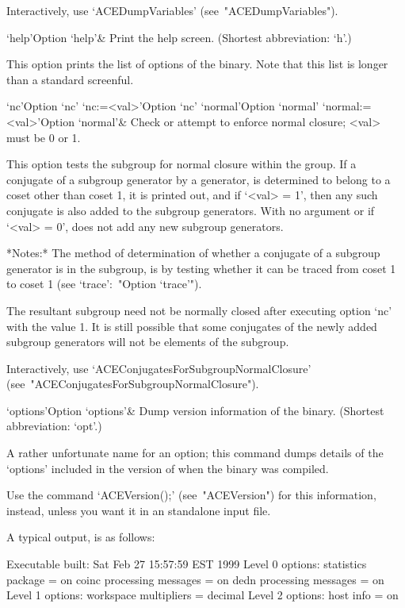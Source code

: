 Interactively, use `ACEDumpVariables' (see~"ACEDumpVariables").

\>`help'{Option `help'}&
Print the {\ACE} help screen. (Shortest abbreviation: `h'.)

This option prints the list of options of the {\ACE} binary. Note that
this list is longer than a standard screenful.

\>`nc'{Option `nc'}
\>`nc:=<val>'{Option `nc'}
\>`normal'{Option `normal'}
\>`normal:=<val>'{Option `normal'}&
Check or attempt to enforce normal closure; <val> must be 0 or 1.

This option tests the subgroup for normal closure within the group. If
a conjugate of a subgroup generator by a generator, is  determined  to
belong to a coset other than coset 1, it is printed out, and if `<val>
=  1',  then  any  such  conjugate  is  also  added  to  the  subgroup
generators. With no argument or if `<val> = 0', {\ACE}  does  not  add
any new subgroup generators.

*Notes:*
The method of determination of  whether  a  conjugate  of  a  subgroup
generator is in the subgroup, is by testing whether it can  be  traced
from coset 1 to coset 1  (see  `trace':~"Option `trace'").

The resultant subgroup need not be  normally  closed  after  executing
option `nc'  with  the  value  1.  It  is  still  possible  that  some
conjugates of the newly added subgroup generators will not be elements
of the subgroup.

Interactively,       use       `ACEConjugatesForSubgroupNormalClosure'
(see~"ACEConjugatesForSubgroupNormalClosure").

\>`options'{Option `options'}&
Dump version information of the {\ACE} binary.
(Shortest abbreviation: `opt'.)

A rather unfortunate name for an option; this command dumps details of
the \lq{}options' included in the version of {\ACE}  when  the  {\ACE}
binary was compiled.

Use  the   command   `ACEVersion();'   (see~"ACEVersion")   for   this
information, instead, unless you want it in an {\ACE} standalone input
file.

A typical output, is as follows:

\begintt
Executable built:
  Sat Feb 27 15:57:59 EST 1999
Level 0 options:
  statistics package = on
  coinc processing messages = on
  dedn processing messages = on
Level 1 options:
  workspace multipliers = decimal
Level 2 options:
  host info = on
\endtt

